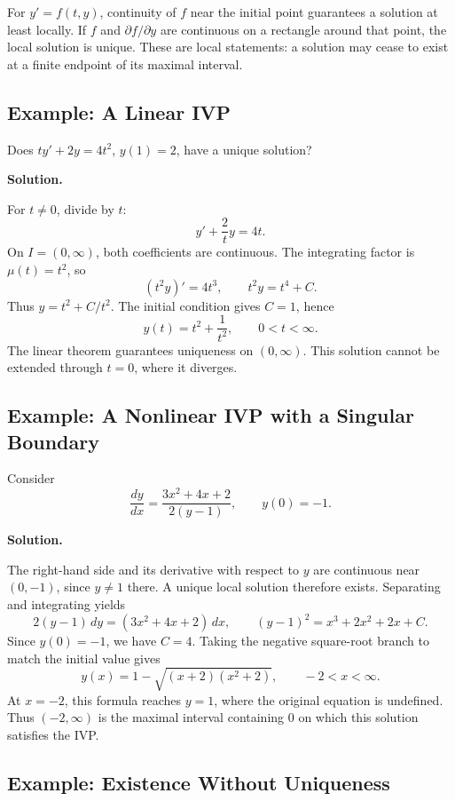 \documentclass[11pt]{article}
\newenvironment{solution}
    {\par\noindent\textbf{Solution.}\par}
    {\par}
\begin{document}
For \(y'=f(t,y)\), continuity of \(f\) near the initial point
guarantees a solution at least locally. If \(f\) and
\(\partial f/\partial y\) are continuous on a rectangle around that
point, the local solution is unique. These are local statements: a
solution may cease to exist at a finite endpoint of its maximal
interval.

\subsection{Example: A Linear IVP}

Does \(ty'+2y=4t^2\), \(y(1)=2\), have a unique solution?

\begin{solution}
For \(t\ne0\), divide by \(t\):
\[
y'+\frac{2}{t}y=4t.
\]
On \(I=(0,\infty)\), both coefficients are continuous. The
integrating factor is \(\mu(t)=t^2\), so
\[
(t^2y)'=4t^3, \qquad t^2y=t^4+C.
\]
Thus \(y=t^2+C/t^2\). The initial condition gives \(C=1\), hence
\[
\boxed{y(t)=t^2+\frac{1}{t^2},\qquad 0<t<\infty.}
\]
The linear theorem guarantees uniqueness on \((0,\infty)\). This
solution cannot be extended through \(t=0\), where it diverges.
\end{solution}

\subsection{Example: A Nonlinear IVP with a Singular Boundary}

Consider
\[
\frac{dy}{dx}=\frac{3x^2+4x+2}{2(y-1)}, \qquad y(0)=-1.
\]

\begin{solution}
The right-hand side and its derivative with respect to \(y\) are
continuous near \((0,-1)\), since \(y\ne1\) there. A unique local
solution therefore exists. Separating and integrating yields
\[
2(y-1)\,dy=(3x^2+4x+2)\,dx,
\qquad
(y-1)^2=x^3+2x^2+2x+C.
\]
Since \(y(0)=-1\), we have \(C=4\). Taking the negative square-root
branch to match the initial value gives
\[
\boxed{y(x)=1-\sqrt{(x+2)(x^2+2)},\qquad -2<x<\infty.}
\]
At \(x=-2\), this formula reaches \(y=1\), where the original
equation is undefined. Thus \((-2,\infty)\) is the maximal interval
containing \(0\) on which this solution satisfies the IVP.
\end{solution}

\subsection{Example: Existence Without Uniqueness}
\end{document}
